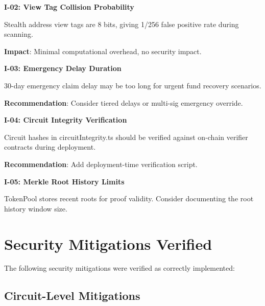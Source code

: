\documentclass[11pt,a4paper]{article}
\begin{document}
\begin{infobox}
\textbf{I-02: View Tag Collision Probability}

Stealth address view tags are 8 bits, giving 1/256 false positive rate during scanning.

\textbf{Impact}: Minimal computational overhead, no security impact.
\end{infobox}

\begin{infobox}
\textbf{I-03: Emergency Delay Duration}

30-day emergency claim delay may be too long for urgent fund recovery scenarios.

\textbf{Recommendation}: Consider tiered delays or multi-sig emergency override.
\end{infobox}

\begin{infobox}
\textbf{I-04: Circuit Integrity Verification}

Circuit hashes in circuitIntegrity.ts should be verified against on-chain verifier contracts during deployment.

\textbf{Recommendation}: Add deployment-time verification script.
\end{infobox}

\begin{infobox}
\textbf{I-05: Merkle Root History Limits}

TokenPool stores recent roots for proof validity. Consider documenting the root history window size.
\end{infobox}

\section{Security Mitigations Verified}

The following security mitigations were verified as correctly implemented:

\subsection{Circuit-Level Mitigations}
\end{document}
